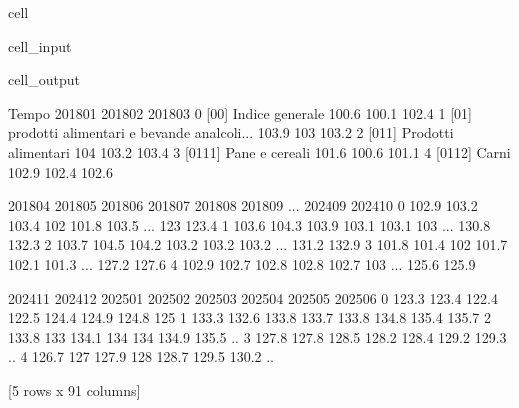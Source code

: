 \documentclass[letterpaper,10pt,english]{jupyterBook}
\begin{document}
\begin{sphinxuseclass}{cell}\begin{sphinxVerbatimInput}

\begin{sphinxuseclass}{cell_input}
\begin{sphinxVerbatim}[commandchars=\\\{\}]
\PYG{p}{[}\PYG{p}{]}
\end{sphinxVerbatim}

\end{sphinxuseclass}\end{sphinxVerbatimInput}
\begin{sphinxVerbatimOutput}

\begin{sphinxuseclass}{cell_output}
\begin{sphinxVerbatim}[commandchars=\\\{\}]
                                               Tempo 2018\PYGZhy{}01 2018\PYGZhy{}02 2018\PYGZhy{}03  \PYGZbs{}
0                             [00] Indice generale     100.6   100.1   102.4   
1  [01] \PYGZhy{}\PYGZhy{} prodotti alimentari e bevande analcoli...   103.9     103   103.2   
2                        [011] Prodotti alimentari       104   103.2   103.4   
3                            [0111] Pane e cereali     101.6   100.6   101.1   
4                                     [0112] Carni     102.9   102.4   102.6   

  2018\PYGZhy{}04 2018\PYGZhy{}05 2018\PYGZhy{}06 2018\PYGZhy{}07 2018\PYGZhy{}08 2018\PYGZhy{}09  ... 2024\PYGZhy{}09 2024\PYGZhy{}10  \PYGZbs{}
0   102.9   103.2   103.4     102   101.8   103.5  ...     123   123.4   
1   103.6   104.3   103.9   103.1   103.1     103  ...   130.8   132.3   
2   103.7   104.5   104.2   103.2   103.2   103.2  ...   131.2   132.9   
3   101.8   101.4     102   101.7   102.1   101.3  ...   127.2   127.6   
4   102.9   102.7   102.8   102.8   102.7     103  ...   125.6   125.9   

  2024\PYGZhy{}11 2024\PYGZhy{}12 2025\PYGZhy{}01 2025\PYGZhy{}02 2025\PYGZhy{}03 2025\PYGZhy{}04 2025\PYGZhy{}05 2025\PYGZhy{}06  
0   123.3   123.4   122.4   122.5   124.4   124.9   124.8     125  
1   133.3   132.6   133.8   133.7   133.8   134.8   135.4   135.7  
2   133.8     133   134.1     134     134   134.9   135.5      ..  
3   127.8   127.8   128.5   128.2   128.4   129.2   129.3      ..  
4   126.7     127   127.9     128   128.7   129.5   130.2      ..  

[5 rows x 91 columns]
\end{sphinxVerbatim}

\end{sphinxuseclass}\end{sphinxVerbatimOutput}

\end{sphinxuseclass}
\end{document}

